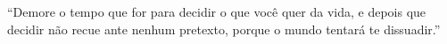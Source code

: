\enquote{Demore o tempo que
for para decidir o que
você quer da vida, e
depois que decidir
não recue ante
nenhum pretexto,
porque o mundo
tentará te dissuadir.}


